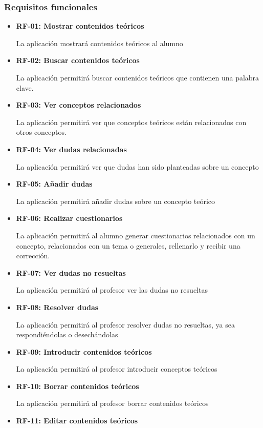 \documentclass[openright,twoside,10pt]{book}
\begin{document}
    \subsubsection{Requisitos funcionales}\label{requisitos-funcionales}
    
    \begin{itemize}
    \item
      \textbf{RF-01: Mostrar contenidos teóricos}
    
      La aplicación mostrará contenidos teóricos al alumno
    \item
      \textbf{RF-02: Buscar contenidos teóricos}
    
      La aplicación permitirá buscar contenidos teóricos que contienen una
      palabra clave.
    \item
      \textbf{RF-03: Ver conceptos relacionados}
    
      La aplicación permitirá ver que conceptos teóricos están relacionados
      con otros conceptos.
    \item
      \textbf{RF-04: Ver dudas relacionadas}
    
      La aplicación permitirá ver que dudas han sido planteadas sobre un
      concepto
    \item
      \textbf{RF-05: Añadir dudas}
    
      La aplicación permitirá añadir dudas sobre un concepto teórico
    \item
      \textbf{RF-06: Realizar cuestionarios}
    
      La aplicación permitirá al alumno generar cuestionarios relacionados
      con un concepto, relacionados con un tema o generales, rellenarlo y
      recibir una corrección.
    \item
      \textbf{RF-07: Ver dudas no resueltas}
    
      La aplicación permitirá al profesor ver las dudas no resueltas
    \item
      \textbf{RF-08: Resolver dudas}
    
      La aplicación permitirá al profesor resolver dudas no resueltas, ya
      sea respondiéndolas o desechándolas
    \item
      \textbf{RF-09: Introducir contenidos teóricos}
    
      La aplicación permitirá al profesor introducir conceptos teóricos
    \item
      \textbf{RF-10: Borrar contenidos teóricos}
    
      La aplicación permitirá al profesor borrar contenidos teóricos
    \item
      \textbf{RF-11: Editar contenidos teóricos}
    

\end{itemize}
\end{document}
